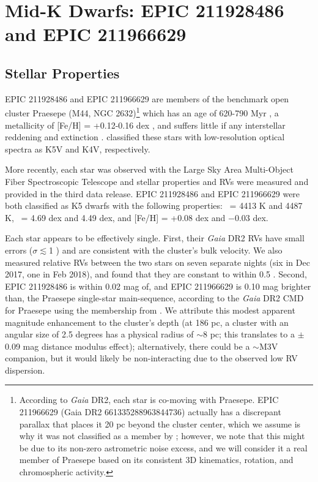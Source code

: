 \section{Mid-K Dwarfs: EPIC 211928486 and EPIC 211966629} \label{sec:k2}
\subsection{Stellar Properties}
%
EPIC 211928486 and EPIC 211966629 
are members of the benchmark open cluster Praesepe (M44, NGC 2632)\footnote{According to 
\textit{Gaia} DR2, 
each star is co-moving with Praesepe. 
EPIC 211966629 (Gaia DR2 661335288963844736) 
actually has a discrepant parallax 
that places it 20 pc beyond the cluster center, 
which we assume is why it was not classified as a member by 
\citet{DR2HRD}; 
however, we note that this might be due to 
its non-zero astrometric noise excess, 
and we will consider it a real member of Praesepe 
based on its consistent 3D kinematics, 
rotation, and chromospheric activity.}
which
has an age of 620-790 Myr
\citep{DR2HRD, Gossage2018, Cummings2017, Choi2016, Brandt2015}, 
a metallicity of [Fe/H] = +0.12-0.16 dex 
\citep[although various results in the literature 
range from +0.038 to +0.27 dex; see Table 4 in][]{Cummings2017}, 
and suffers little if any interstellar reddening and extinction
\citep[$E(B-V) = 0.027$,][]{Taylor2006}. 
\citet{Allen1995} classified these
stars with low-resolution optical spectra 
as K5V and K4V, respectively.

More recently, each star was observed with the 
Large Sky Area Multi-Object Fiber Spectroscopic Telescope \citep[LAMOST;][]{Luo2015}
and stellar properties and RVs 
were measured and provided in the third data release. 
EPIC 211928486 and EPIC 211966629 were both classified as K5 dwarfs with the following properties: 
\teff\ = 4413 K and 4487 K, 
\logg\ = 4.69 dex and 4.49 dex, and
[Fe/H] = +0.08 dex and $-0.03$ dex.

Each star appears to be effectively single. 
First, 
their \textit{Gaia} DR2 RVs have small errors 
($\sigma \lesssim$1 \kms) 
and are consistent with the cluster's bulk velocity.
We also measured relative RVs between the two stars 
on seven separate nights (six in Dec 2017, 
one in Feb 2018), 
and found that they are constant 
to within 0.5 \kms.
Second, 
EPIC 211928486 is within 0.02 mag of,
and 
EPIC 211966629 is 0.10 mag brighter than,
the Praesepe single-star main-sequence, 
according to the 
\textit{Gaia} DR2 CMD for Praesepe 
using the membership from \citet{DR2HRD}.
We attribute this modest apparent magnitude enhancement 
to the cluster's depth 
(at 186 pc, a cluster with an angular size of 2.5 degrees 
has a physical radius of $\sim$8 pc; 
this translates to a $\pm$0.09 mag distance modulus effect); 
alternatively, 
there could be a $\sim$M3V companion, but 
it would likely be non-interacting due to the observed 
low RV dispersion.

